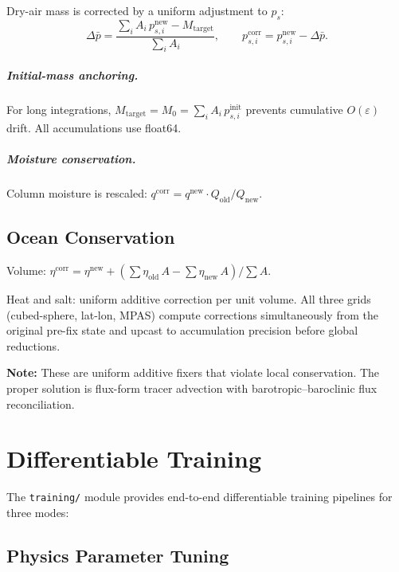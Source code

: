 \documentclass[11pt,twoside]{report}
\begin{document}
Dry-air mass is corrected by a uniform adjustment to $p_s$:
\begin{equation}
  \Delta\bar p = \frac{\sum_i A_i\,p_{s,i}^{\mathrm{new}} - M_{\mathrm{target}}}
  {\sum_i A_i},
  \qquad
  p_{s,i}^{\mathrm{corr}} = p_{s,i}^{\mathrm{new}} - \Delta\bar p.
\end{equation}

\paragraph{Initial-mass anchoring.}
For long integrations, $M_{\mathrm{target}}=M_0=\sum_i A_i\,p_{s,i}^{\mathrm{init}}$
prevents cumulative $O(\varepsilon)$ drift.  All accumulations use float64.

\paragraph{Moisture conservation.}
Column moisture is rescaled:
$q^{\mathrm{corr}}=q^{\mathrm{new}}\cdot Q_{\mathrm{old}}/Q_{\mathrm{new}}$.

\section{Ocean Conservation}

Volume: $\eta^{\mathrm{corr}}=\eta^{\mathrm{new}}
+(\sum\eta_{\mathrm{old}}\,A-\sum\eta_{\mathrm{new}}\,A)/\sum A$.

Heat and salt: uniform additive correction per unit volume.
All three grids (cubed-sphere, lat-lon, MPAS) compute corrections simultaneously from the original pre-fix state and upcast to accumulation precision before global reductions.

\textbf{Note:} These are uniform additive fixers that violate local conservation.  The proper solution is flux-form tracer advection with barotropic--baroclinic flux reconciliation.


\chapter{Differentiable Training}
\label{ch:training}

The \texttt{training/} module provides end-to-end differentiable training
pipelines for three modes:

\section{Physics Parameter Tuning}
\end{document}
